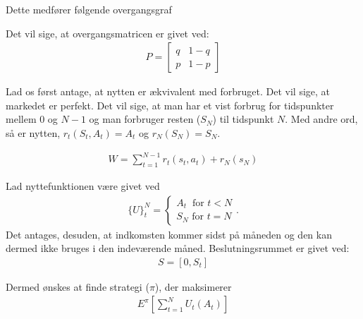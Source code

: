 Dette medfører følgende overgangsgraf\\

Det vil sige, at overgangsmatricen er givet ved:\\
\begin{align*}
    P=\begin{bmatrix}q & 1-q\\ p & 1-p\end{bmatrix}
\end{align*}

Lad os først antage, at nytten er ækvivalent med forbruget. Det vil sige, at markedet er perfekt. Det vil sige, at man har et vist forbrug for tidspunkter mellem 0 og $N-1$ og man forbruger resten ($S_N$) til tidspunkt $N$. Med andre ord, så er nytten, $r_t(S_t,A_t)=A_t$ og $r_N(S_N)=S_N$.


\begin{align*}
    W=\sum_{t=1}^{N-1} r_t(s_t,a_t)+ r_N(s_N)
\end{align*}

Lad nyttefunktionen være givet ved
\begin{align*}
    \{U\}_t^N=\begin{cases}A_t\ \text{ for } t<N\\ S_N \text{ for } t=N \end{cases}.
\end{align*}
Det antages, desuden, at indkomsten kommer sidst på måneden og den kan dermed ikke bruges i den indeværende måned. Beslutningsrummet er givet ved:
\begin{align*}
    S=[0,S_t]
\end{align*}

Dermed ønskes at finde strategi ($\pi$), der maksimerer
\begin{align*}
    E^\pi \left[\sum_{t=1}^N U_t(A_t)\right]
\end{align*}







